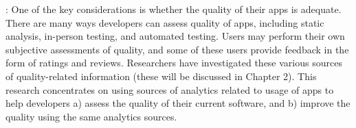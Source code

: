 \medskip
{}: One of the key considerations is whether the quality of their apps is adequate. There are many ways developers can assess quality of apps, including static analysis, in-person testing, and automated testing. Users may perform their own subjective assessments of quality, and some of these users provide feedback in the form of ratings and reviews. Researchers have investigated these various sources of quality-related information (these will be discussed in Chapter 2). This research concentrates on using sources of analytics related to usage of apps to help developers a) assess the quality of their current software, and b) improve the quality using the same analytics sources.

